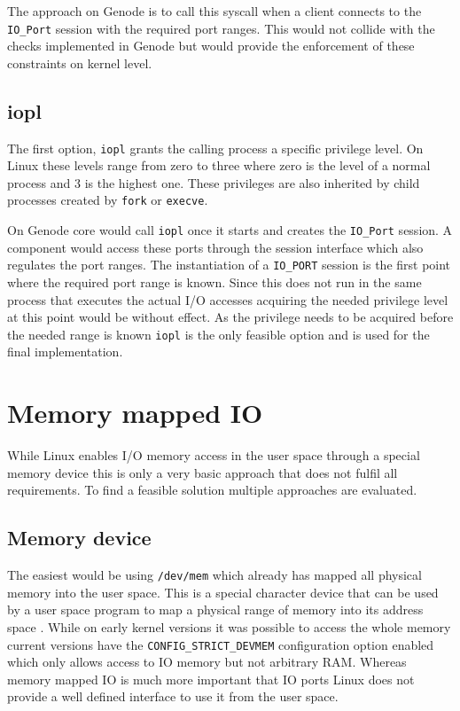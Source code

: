 \documentclass[
a4paper,
11pt,
twoside
]{report}
\begin{document}
		The approach on Genode is to call this syscall when a client connects to the \texttt{IO\_Port} session with the required port ranges.
		This would not collide with the checks implemented in Genode but would provide the enforcement of these constraints on kernel level.
				
		\subsection{iopl}
		
		The first option, \texttt{iopl} grants the calling process a specific privilege level.
		On Linux these levels range from zero to three where zero is the level of a normal process and 3 is the highest one.
		These privileges are also inherited by child processes created by \texttt{fork} or \texttt{execve}. \citep{iopl}
		
		On Genode core would call \texttt{iopl} once it starts and creates the \texttt{IO\_Port} session.
		A component would access these ports through the session interface which also regulates the port ranges.
		The instantiation of a \texttt{IO\_PORT} session is the first point where the required port range is known.
		Since this does not run in the same process that executes the actual I/O accesses acquiring the needed privilege level at this point would be without effect.
		As the privilege needs to be acquired before the needed range is known \texttt{iopl} is the only feasible option and is used for the final implementation.
		
		\section{Memory mapped IO}
		
		While Linux enables I/O memory access in the user space through a special memory device this is only a very basic approach that does not fulfil all requirements.
		To find a feasible solution multiple approaches are evaluated.
		
		\subsection{Memory device}
		
		The easiest would be using \texttt{/dev/mem} which already has mapped all physical memory into the user space.
		This is a special character device that can be used by a user space program to map a physical range of memory into its address space \citep{devmem}.
		While on early kernel versions it was possible to access the whole memory current versions have the \texttt{CONFIG\_STRICT\_DEVMEM} configuration option enabled which only allows access to IO memory but not arbitrary RAM.
		Whereas memory mapped IO is much more important that IO ports Linux does not provide a well defined interface to use it from the user space.
		
\end{document}
